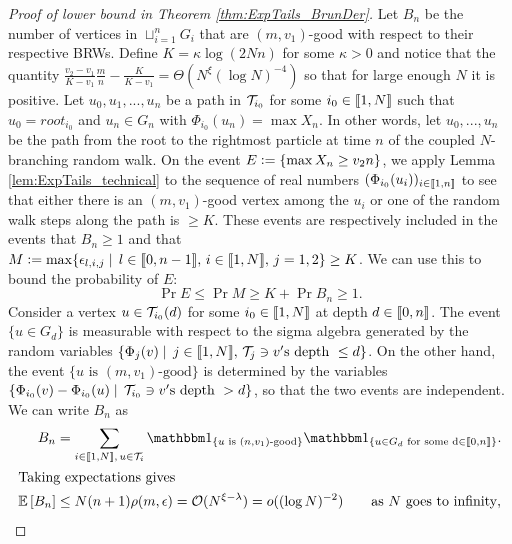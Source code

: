 \begin{proof}[Proof of lower bound in Theorem \ref{thm:ExpTails_BrunDer}]
 Let $B_n$ be the number of vertices in $\sqcup_{i=1}^n G_i$ that are $(m, v_1)$-good with respect to their respective BRWs. Define $K = \kappa \log (2Nn)$ for some $\kappa > 0$ and notice that the quantity $\frac{v_2 - v_1}{K - v_1}\frac{m}{n} - \frac{K}{K - v_1} = \Theta(N^\xi (\log N)^{-4})$ so that for large enough $N$ it is positive. Let $u_0, u_1, ..., u_n$ be a path in $\cal{T}_{i_0}$ for some $i_0 \in \bbracket{1,N}$ such that $u_0 = root_{i_0}$ and $u_n \in G_n$ with $\Phi_{i_0}(u_n) = \max X_n$. In other words, let $u_0, ..., u_n$ be the path from the root to the rightmost particle at time $n$ of the coupled $N$-branching random walk. On the event $E \defeq \{ \max X_n \geq v_2 n \}$, we apply Lemma \ref{lem:ExpTails_technical} to the sequence of real numbers $(\Phi_{i_0}(u_i))_{i \in \bbracket{1,n}}$ to see that either there is an $(m, v_1)$-good vertex among the $u_i$ or one of the random walk steps along the path is $ \geq K$. These events are respectively included in the events that $B_n \geq 1$ and that $M \defeq \max \{\epsilon_{l, i, j} \mid\, l \in \bbracket{0, n - 1},\, i \in \bbracket{1,N},\, j = 1,2 \} \geq K$. We can use this to bound the probability of $E$:
\begin{equation}
\Pr{E} \leq \Pr{M \geq K} + \Pr{B_n \geq 1}. 
\end{equation}
Consider a vertex $u \in \cal{T}_{i_0}(d)$ for some $i_0 \in \bbracket{1,N}$ at depth $d \in \bbracket{0, n}$. The event $\{u \in G_d\}$ is measurable with respect to the sigma algebra generated by the random variables $\{ \Phi_j(v) \mid\, j \in \bbracket{1, N},\,\cal{T}_j \ni v'\text{s depth }\leq d\}$. On the other hand, the event $\{ u \text{ is }(m, v_1) \text{-good}\}$ is determined by the variables $\{ \Phi_{i_0}(v) - \Phi_{i_0}(u) \mid\, \cal{T}_{i_0} \ni v'\text{s depth }> d\}$, so that the two events are independent. We can write $B_n$ as 
\begin{align*}
B_n &= \sum\limits_{i \in \bbracket{1,N},\,u \in \cal{T}_i} \Ind_{\{u \text{ is } (n, v_1)\text{-good}\}} \Ind_{\{u \in G_d \text{ for some d} \in \bbracket{0,n}\}}. \\
\intertext{Taking expectations gives}\label{eqn:B_nOrder}
\Ex{B_n} &\leq N(n+1)\rho(m, \epsilon) = \cal{O}(N^{\xi -\lambda}) = o((\log N)^{-2}) \qquad\text{as $N$ goes to infinity}, 
\end{align*}

\end{proof}
